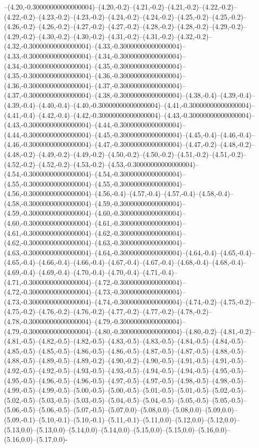--(4.20,-0.30000000000000004)--(4.20,-0.2)--(4.21,-0.2)--(4.21,-0.2)--(4.22,-0.2)--(4.22,-0.2)--(4.23,-0.2)--(4.23,-0.2)--(4.24,-0.2)--(4.24,-0.2)--(4.25,-0.2)--(4.25,-0.2)--(4.26,-0.2)--(4.26,-0.2)--(4.27,-0.2)--(4.27,-0.2)--(4.28,-0.2)--(4.28,-0.2)--(4.29,-0.2)--(4.29,-0.2)--(4.30,-0.2)--(4.30,-0.2)--(4.31,-0.2)--(4.31,-0.2)--(4.32,-0.2)--(4.32,-0.30000000000000004)--(4.33,-0.30000000000000004)--(4.33,-0.30000000000000004)--(4.34,-0.30000000000000004)--(4.34,-0.30000000000000004)--(4.35,-0.30000000000000004)--(4.35,-0.30000000000000004)--(4.36,-0.30000000000000004)--(4.36,-0.30000000000000004)--(4.37,-0.30000000000000004)--(4.37,-0.30000000000000004)--(4.38,-0.30000000000000004)--(4.38,-0.4)--(4.39,-0.4)--(4.39,-0.4)--(4.40,-0.4)--(4.40,-0.30000000000000004)--(4.41,-0.30000000000000004)--(4.41,-0.4)--(4.42,-0.4)--(4.42,-0.30000000000000004)--(4.43,-0.30000000000000004)--(4.43,-0.30000000000000004)--(4.44,-0.30000000000000004)--(4.44,-0.30000000000000004)--(4.45,-0.30000000000000004)--(4.45,-0.4)--(4.46,-0.4)--(4.46,-0.30000000000000004)--(4.47,-0.30000000000000004)--(4.47,-0.2)--(4.48,-0.2)--(4.48,-0.2)--(4.49,-0.2)--(4.49,-0.2)--(4.50,-0.2)--(4.50,-0.2)--(4.51,-0.2)--(4.51,-0.2)--(4.52,-0.2)--(4.52,-0.2)--(4.53,-0.2)--(4.53,-0.30000000000000004)--(4.54,-0.30000000000000004)--(4.54,-0.30000000000000004)--(4.55,-0.30000000000000004)--(4.55,-0.30000000000000004)--(4.56,-0.30000000000000004)--(4.56,-0.4)--(4.57,-0.4)--(4.57,-0.4)--(4.58,-0.4)--(4.58,-0.30000000000000004)--(4.59,-0.30000000000000004)--(4.59,-0.30000000000000004)--(4.60,-0.30000000000000004)--(4.60,-0.30000000000000004)--(4.61,-0.30000000000000004)--(4.61,-0.30000000000000004)--(4.62,-0.30000000000000004)--(4.62,-0.30000000000000004)--(4.63,-0.30000000000000004)--(4.63,-0.30000000000000004)--(4.64,-0.30000000000000004)--(4.64,-0.4)--(4.65,-0.4)--(4.65,-0.4)--(4.66,-0.4)--(4.66,-0.4)--(4.67,-0.4)--(4.67,-0.4)--(4.68,-0.4)--(4.68,-0.4)--(4.69,-0.4)--(4.69,-0.4)--(4.70,-0.4)--(4.70,-0.4)--(4.71,-0.4)--(4.71,-0.30000000000000004)--(4.72,-0.30000000000000004)--(4.72,-0.30000000000000004)--(4.73,-0.30000000000000004)--(4.73,-0.30000000000000004)--(4.74,-0.30000000000000004)--(4.74,-0.2)--(4.75,-0.2)--(4.75,-0.2)--(4.76,-0.2)--(4.76,-0.2)--(4.77,-0.2)--(4.77,-0.2)--(4.78,-0.2)--(4.78,-0.30000000000000004)--(4.79,-0.30000000000000004)--(4.79,-0.30000000000000004)--(4.80,-0.30000000000000004)--(4.80,-0.2)--(4.81,-0.2)--(4.81,-0.5)--(4.82,-0.5)--(4.82,-0.5)--(4.83,-0.5)--(4.83,-0.5)--(4.84,-0.5)--(4.84,-0.5)--(4.85,-0.5)--(4.85,-0.5)--(4.86,-0.5)--(4.86,-0.5)--(4.87,-0.5)--(4.87,-0.5)--(4.88,-0.5)--(4.88,-0.5)--(4.89,-0.5)--(4.89,-0.2)--(4.90,-0.2)--(4.90,-0.5)--(4.91,-0.5)--(4.91,-0.5)--(4.92,-0.5)--(4.92,-0.5)--(4.93,-0.5)--(4.93,-0.5)--(4.94,-0.5)--(4.94,-0.5)--(4.95,-0.5)--(4.95,-0.5)--(4.96,-0.5)--(4.96,-0.5)--(4.97,-0.5)--(4.97,-0.5)--(4.98,-0.5)--(4.98,-0.5)--(4.99,-0.5)--(4.99,-0.5)--(5.00,-0.5)--(5.00,-0.5)--(5.01,-0.5)--(5.01,-0.5)--(5.02,-0.5)--(5.02,-0.5)--(5.03,-0.5)--(5.03,-0.5)--(5.04,-0.5)--(5.04,-0.5)--(5.05,-0.5)--(5.05,-0.5)--(5.06,-0.5)--(5.06,-0.5)--(5.07,-0.5)--(5.07,0.0)--(5.08,0.0)--(5.08,0.0)--(5.09,0.0)--(5.09,-0.1)--(5.10,-0.1)--(5.10,-0.1)--(5.11,-0.1)--(5.11,0.0)--(5.12,0.0)--(5.12,0.0)--(5.13,0.0)--(5.13,0.0)--(5.14,0.0)--(5.14,0.0)--(5.15,0.0)--(5.15,0.0)--(5.16,0.0)--(5.16,0.0)--(5.17,0.0)-